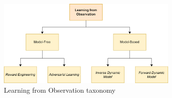 \begin{figure}[t]
    
    \includegraphics[width=0.8\textwidth]{figures/images/lfo_taxonomy.png}
    \caption{Learning from Observation taxonomy}
    \label{fig:lfo_taxonomy}
    
\end{figure}

